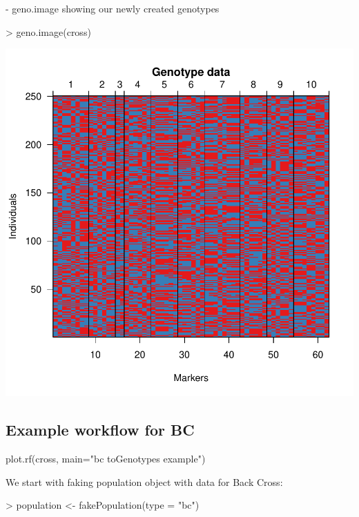 \documentclass{article}
\begin{document}
\newpage
{\noindent}- geno.image showing our newly created genotypes
\begin{Schunk}
\begin{Sinput}
> geno.image(cross)
\end{Sinput}
\end{Schunk}
\includegraphics{manual-014}
\newpage
\subsection{Example workflow for BC}


	
	plot.rf(cross, main="bc toGenotypes example")

{\noindent}We start with faking population object with data for Back Cross:
\begin{Schunk}
\begin{Sinput}
> population <- fakePopulation(type = "bc")
\end{Sinput}
\end{Schunk}
\end{document}
